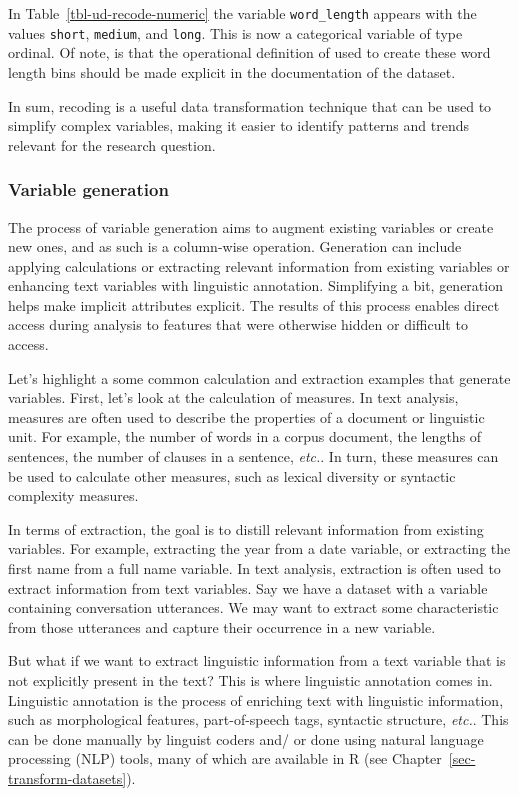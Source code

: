 \documentclass[
  letterpaper,
  DIV=11,
  numbers=noendperiod]{scrreport}
\theoremstyle{definition}
\theoremstyle{remark}
\begin{document}
In Table~\ref{tbl-ud-recode-numeric} the variable \texttt{word\_length}
appears with the values \texttt{short}, \texttt{medium}, and
\texttt{long}. This is now a categorical variable of type ordinal. Of
note, is that the operational definition of used to create these word
length bins should be made explicit in the documentation of the dataset.

In sum, recoding is a useful data transformation technique that can be
used to simplify complex variables, making it easier to identify
patterns and trends relevant for the research question.

\hypertarget{sec-ud-variable-generation}{%
\subsubsection{Variable generation}\label{sec-ud-variable-generation}}

The process of variable generation aims to augment existing variables or
create new ones, and as such is a column-wise operation. Generation can
include applying calculations or extracting relevant information from
existing variables or enhancing text variables with linguistic
annotation. Simplifying a bit, generation helps make implicit attributes
explicit. The results of this process enables direct access during
analysis to features that were otherwise hidden or difficult to access.

Let's highlight a some common calculation and extraction examples that
generate variables. First, let's look at the calculation of measures. In
text analysis, measures are often used to describe the properties of a
document or linguistic unit. For example, the number of words in a
corpus document, the lengths of sentences, the number of clauses in a
sentence, \emph{etc.}. In turn, these measures can be used to calculate
other measures, such as lexical diversity or syntactic complexity
measures.

In terms of extraction, the goal is to distill relevant information from
existing variables. For example, extracting the year from a date
variable, or extracting the first name from a full name variable. In
text analysis, extraction is often used to extract information from text
variables. Say we have a dataset with a variable containing conversation
utterances. We may want to extract some characteristic from those
utterances and capture their occurrence in a new variable.

But what if we want to extract linguistic information from a text
variable that is not explicitly present in the text? This is where
linguistic annotation comes in. Linguistic annotation is the process of
enriching text with linguistic information, such as morphological
features, part-of-speech tags, syntactic structure, \emph{etc.}. This
can be done manually by linguist coders and/ or done using natural
language processing (NLP) tools, many of which are available in R (see
Chapter~\ref{sec-transform-datasets}).
\end{document}
